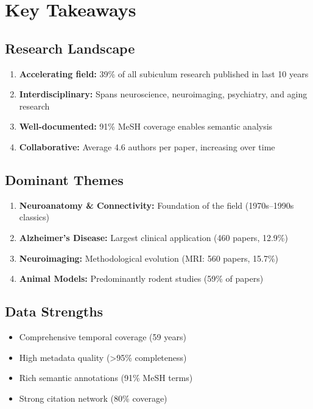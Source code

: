 \documentclass{../latex/analysis_report}
\begin{document}
\section{Key Takeaways}

\subsection{Research Landscape}
\begin{enumerate}[noitemsep]
    \item \textbf{Accelerating field:} 39\% of all subiculum research published in last 10 years
    \item \textbf{Interdisciplinary:} Spans neuroscience, neuroimaging, psychiatry, and aging research
    \item \textbf{Well-documented:} 91\% MeSH coverage enables semantic analysis
    \item \textbf{Collaborative:} Average 4.6 authors per paper, increasing over time
\end{enumerate}

\subsection{Dominant Themes}
\begin{enumerate}[noitemsep]
    \item \textbf{Neuroanatomy \& Connectivity:} Foundation of the field (1970s--1990s classics)
    \item \textbf{Alzheimer's Disease:} Largest clinical application (460 papers, 12.9\%)
    \item \textbf{Neuroimaging:} Methodological evolution (MRI: 560 papers, 15.7\%)
    \item \textbf{Animal Models:} Predominantly rodent studies (59\% of papers)
\end{enumerate}

\subsection{Data Strengths}
\begin{itemize}[noitemsep]
    \item Comprehensive temporal coverage (59 years)
    \item High metadata quality (>95\% completeness)
    \item Rich semantic annotations (91\% MeSH terms)
    \item Strong citation network (80\% coverage)
\end{itemize}
\end{document}
